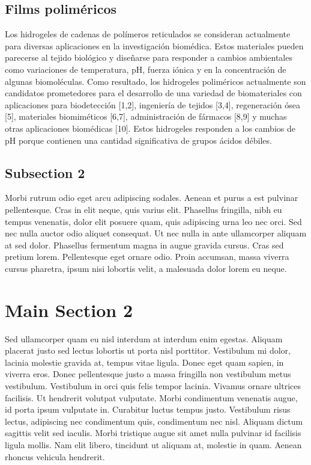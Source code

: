 \subsection{Films poliméricos}

Los hidrogeles de cadenas de polímeros reticulados se consideran actualmente para diversas aplicaciones en la investigación biomédica.%
 Estos materiales pueden parecerse al tejido biol\'ogico y dise\~narse para responder a cambios ambientales como variaciones de temperatura, pH, fuerza i\'onica y en la concentraci\'on de algunas biomol\'eculas. Como resultado, los hidrogeles polim\'ericos actualmente son candidatos prometedores para el desarrollo de una variedad de biomateriales con aplicaciones para biodetección [1,2], ingenier\'ia de tejidos [3,4], regeneraci\'on \'osea [5], materiales biomim\'eticos [6,7], administraci\'on de f\'armacos [8,9] y muchas otras aplicaciones biom\'edicas [10].
Estos hidrogeles responden a los cambios de pH porque contienen una cantidad significativa de grupos ácidos débiles.

\subsection{Subsection 2}
Morbi rutrum odio eget arcu adipiscing sodales. Aenean et purus a est pulvinar pellentesque. Cras in elit neque, quis varius elit. Phasellus fringilla, nibh eu tempus venenatis, dolor elit posuere quam, quis adipiscing urna leo nec orci. Sed nec nulla auctor odio aliquet consequat. Ut nec nulla in ante ullamcorper aliquam at sed dolor. Phasellus fermentum magna in augue gravida cursus. Cras sed pretium lorem. Pellentesque eget ornare odio. Proin accumsan, massa viverra cursus pharetra, ipsum nisi lobortis velit, a malesuada dolor lorem eu neque.


\section{Main Section 2}

Sed ullamcorper quam eu nisl interdum at interdum enim egestas. Aliquam placerat justo sed lectus lobortis ut porta nisl porttitor. Vestibulum mi dolor, lacinia molestie gravida at, tempus vitae ligula. Donec eget quam sapien, in viverra eros. Donec pellentesque justo a massa fringilla non vestibulum metus vestibulum. Vestibulum in orci quis felis tempor lacinia. Vivamus ornare ultrices facilisis. Ut hendrerit volutpat vulputate. Morbi condimentum venenatis augue, id porta ipsum vulputate in. Curabitur luctus tempus justo. Vestibulum risus lectus, adipiscing nec condimentum quis, condimentum nec nisl. Aliquam dictum sagittis velit sed iaculis. Morbi tristique augue sit amet nulla pulvinar id facilisis ligula mollis. Nam elit libero, tincidunt ut aliquam at, molestie in quam. Aenean rhoncus vehicula hendrerit.




